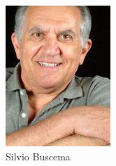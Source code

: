 \begin{frame}{}
\begin{figure}[htp]
\begin{subfigure}[b]{0.16\textwidth}
   \includegraphics[width=\textwidth]{img/artistas/SalBuscema}
   \caption{Silvio  Buscema}
 \end{subfigure}
 ~
 \begin{subfigure}[b]{0.16\textwidth}

\end{subfigure}
\end{figure}
\end{frame}
